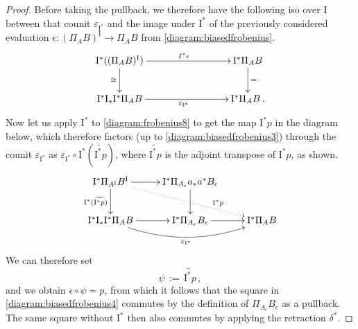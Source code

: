 \documentclass[11pt]{amsart}
\renewcommand{\to}{\ensuremath{\rightarrow}}
\newcommand{\I}{\ensuremath{\mathrm{I}}}
\renewcommand{\i}{\mathsf{i}}
\theoremstyle{remark}
\theoremstyle{definition}
\begin{document}
\begin{proof}
Before taking the pullback, we therefore have the following iso over $\I$ between that counit $\varepsilon_{\I^*}$ and the image under $\I^*$ of the previously considered evaluation $\epsilon : (\Pi_AB)^\I \to \Pi_AB$ from \eqref{diagram:biasedfrobenius}.
\begin{equation}\label{diagram:biasedfrobenius3}
\xymatrix{
\I^*((\Pi_AB)^\I) \ar[d]_{\cong}  \ar[rrr]^{\\I^*\epsilon} &&& \I^*\Pi_AB  \ar[d]^{=} \\
\I^*\I_*\I^*\Pi_AB   \ar[rrr]_{\varepsilon_{\I^*}}  &&&  \I^*\Pi_AB\,.
}
\end{equation}
%
Now let us apply $\I^*$ to  \eqref{diagram:frobenius8} to get the map $\I^*p$ in the diagram below, which therefore factors (up to \eqref{diagram:biasedfrobenius3}) through the counit $\varepsilon_{\I^*}$ as $\varepsilon_{\I^*}\circ\I^*(\widetilde{\I^*p})$, where $\widetilde{\I^*p}$ is the adjoint transpose of $\I^*p$, as shown.
%
\begin{equation}\label{diagram:biasedfrobenius4}
\xymatrix{
\I^*\Pi_{A^\I}B^\I \ar[d]_{\I^*(\widetilde{\I^*p})} \ar[r] \ar@{..>}[rrd]^>>>>>>>>>>>{\I^*p} & \I^*\Pi_{A_\epsilon} a_*a^* B_\epsilon \ar[d] & \\
  \I^*\I_*\I^*\Pi_AB  \ar[r] \ar@/_4ex/ [rr]_{\varepsilon_{\I^*}} & \I^*\Pi_{A_\epsilon}B_\epsilon \ar[r] & \I^*\Pi_{A}B 
}
\end{equation}
%
We can therefore set $$\psi\, := \, \widetilde{\I^*p}\,,$$
and we obtain $\epsilon\circ \psi = p$, from which it follows that the square in \eqref{diagram:biasedfrobenius4} commutes by the definition of $\Pi_{A_\epsilon}B_\epsilon$ as a pullback. The same square without $\I^*$ then also commutes by applying the retraction $\delta^*$.  


\end{proof}
\end{document}
